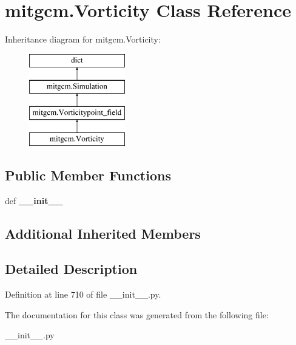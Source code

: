 \hypertarget{classmitgcm_1_1Vorticity}{\section{mitgcm.\+Vorticity Class Reference}
\label{classmitgcm_1_1Vorticity}
}
Inheritance diagram for mitgcm.\+Vorticity\+:\begin{figure}[H]
\begin{center}
\leavevmode
\includegraphics[height=4.000000cm]{classmitgcm_1_1Vorticity}
\end{center}
\end{figure}
\subsection*{Public Member Functions}
\begin{DoxyCompactItemize}
\item 
\hypertarget{classmitgcm_1_1Vorticity_a6fdcf74ea42dc79b3b8eab1eb2a149e4}{def {\bfseries \+\_\+\+\_\+init\+\_\+\+\_\+}}\label{classmitgcm_1_1Vorticity_a6fdcf74ea42dc79b3b8eab1eb2a149e4}

\end{DoxyCompactItemize}
\subsection*{Additional Inherited Members}


\subsection{Detailed Description}


Definition at line 710 of file \+\_\+\+\_\+init\+\_\+\+\_\+.\+py.



The documentation for this class was generated from the following file\+:\begin{DoxyCompactItemize}
\item 
\+\_\+\+\_\+init\+\_\+\+\_\+.\+py\end{DoxyCompactItemize}
